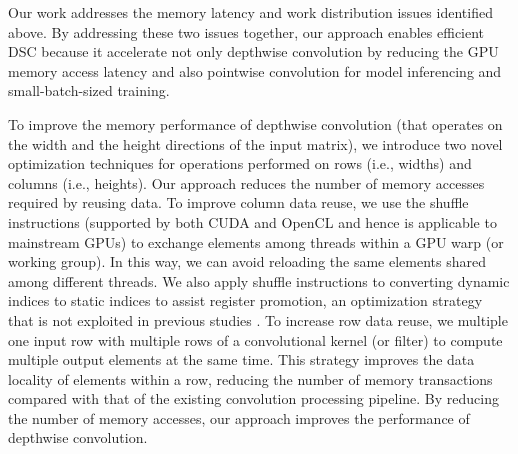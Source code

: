 Our work addresses the memory latency and work distribution issues identified above. By addressing these two issues together, our approach
enables efficient DSC because it accelerate not only depthwise convolution by reducing the GPU memory access latency and also pointwise
convolution for model inferencing and small-batch-sized training.


To improve the memory performance of depthwise convolution (that operates on the width and the height directions of the input matrix), we
introduce two novel optimization techniques for operations performed on rows (i.e., widths) and columns (i.e., heights). Our approach
reduces the number of memory accesses required by reusing data. To improve column data reuse, we use the shuffle instructions (supported by
both CUDA and OpenCL and hence is applicable to mainstream GPUs) to exchange elements among threads within a GPU warp (or working group).
In this way, we can avoid reloading the same elements shared among different threads. We also apply shuffle instructions to converting
dynamic indices to static indices to assist register promotion, an optimization strategy that is not exploited in previous studies
\cite{vasilache2014fast}. To increase row data reuse, we multiple one input row with multiple rows of a convolutional kernel (or filter) to
compute multiple output elements at the same time. This strategy improves the data locality of elements within a row, reducing the number
of memory transactions compared with that of the existing convolution processing pipeline. By reducing the number of memory accesses, our
approach improves the performance of depthwise convolution.


